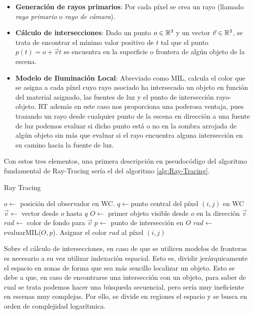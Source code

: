 \begin{itemize}
    \item \textbf{Generación de rayos primarios}: Por cada píxel se crea un rayo (llamado \textit{rayo primario} o \textit{rayo de cámara}).
    \item \textbf{Cálculo de intersecciones}: Dado un punto $o\in\mathbb{R}^3$ y un vector $\vec v\in\mathbb{R}^3$, se trata de encontrar el mínimo valor positivo de $t$ tal que el punto $p(t)=o+\vec v t$ se encuentra en la superficie o frontera de algún objeto de la escena.
    \item \textbf{Modelo de Iluminación Local}: Abreviado como MIL, calcula el color que se asigna a cada píxel cuyo rayo asociado ha intersecado un objeto en función del material asignado, las fuentes de luz y el punto de intersección rayo-objeto. RT además en este caso nos proporciona una poderosa ventaja, pues trazando un rayo desde cualquier punto de la escena en dirección a una fuente de luz podemos evaluar si dicho punto está o no en la sombra arrojada de algún objeto sin más que evaluar si el rayo encuentra alguna intersección en su camino hacia la fuente de luz.
\end{itemize}

Con estos tres elementos, una primera descripción en pseudocódigo del algoritmo fundamental de Ray-Tracing sería el del algoritmo \ref{alg:Ray-Tracing}.

\begin{algorithm}[H]
    \caption{Ray Tracing} \label{alg:Ray-Tracing}
    \begin{algorithmic}
        \State $o\gets$ posición del observador en WC.
            \State $q\gets$punto central del píxel $(i,j)$ en WC
            \State $\vec v\gets$ vector desde $o$ hasta $q$
            \State $O\gets$ primer objeto visible desde $o$ en la dirección $\vec v$
                \State $rad\gets$ color de fondo para $\vec v$ 
            \Else
                \State $p\gets$ punto de intersección en $O$
                \State $rad\gets$ evaluarMIL($O,p$).
            \EndIf
            \State Asignar el color $rad$ al píxel $(i,j)$
        \EndFor
    \end{algorithmic}
\end{algorithm}

Sobre el cálculo de intersecciones, en caso de que se utilicen modelos de fronteras es necesario a su vez utilizar indexación espacial. Esto es, dividir jerárquicamente el espacio en zonas de forma que sea más sencillo localizar un objeto. Esto se debe a que, en caso de encontrarse una intersección con un objeto, para saber de cual se trata podemos hacer una búsqueda secuencial, pero sería muy ineficiente en escenas muy complejas. Por ello, se divide en regiones el espacio y se busca en orden de complejidad logarítmica.

